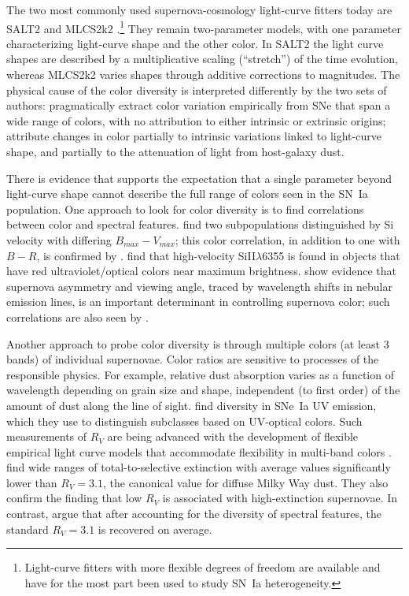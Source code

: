 \documentclass{aastex61}   	%
\begin{document}
The two most commonly used supernova-cosmology light-curve fitters today are SALT2 \citep{2007A&A...466...11G} and MLCS2k2
\citep{2007ApJ...659..122J}.\footnote{Light-curve fitters with more flexible degrees of freedom
\citep[e.g.][]{2008ApJ...681..482C, 2011AJ....141...19B, 2011ApJ...731..120M} are available and have for
the most part been used to study SN~Ia heterogeneity.}
They remain two-parameter models, with one parameter characterizing light-curve shape and the other
 color.
In SALT2 the light curve shapes are described by a multiplicative scaling (``stretch'')  of the time evolution,
 whereas MLCS2k2 varies shapes through additive corrections to magnitudes.
The physical cause of the color diversity is interpreted differently by the two sets of authors: 
\citet{2007A&A...466...11G} pragmatically extract color variation empirically from SNe that span a wide range of colors, with no attribution
to either intrinsic or extrinsic origins;
\citet{2007ApJ...659..122J}
attribute changes in color
partially to intrinsic variations linked to light-curve shape, and partially
to the attenuation of light from host-galaxy dust.


There is evidence that supports the expectation that a single parameter beyond light-curve shape  cannot describe the full range
of colors seen in the SN~Ia population.  One approach to look for color diversity is to find correlations between color and spectral features.
\citet{2009ApJ...699L.139W, 2011ApJ...729...55F} find two subpopulations distinguished
by Si velocity with differing $B_{max}-V_{max}$; this color correlation, in addition to one with $B-R$, is confirmed by
\citet{2014ApJ...797...75M}.
\citet{2015MNRAS.451.1973S}
find that high-velocity SiII$\lambda$6355 is found in objects that have red ultraviolet/optical colors near maximum brightness.
\citet{2011MNRAS.413.3075M} show evidence that supernova asymmetry and viewing angle,
traced by wavelength shifts in nebular emission lines, is an important determinant in controlling supernova color; such correlations are also seen by \citet{2011A&A...534L..15C}.

Another approach to probe color diversity is through multiple colors (at least 3 bands)
of individual supernovae.  Color ratios are sensitive to processes of the responsible physics.   For example,
relative dust absorption varies as a function of wavelength depending on grain size and shape,
independent (to first order) of the amount of dust along the line of sight.
\citet{2013ApJ...779...23M} find diversity in SNe~Ia UV emission, which they use to distinguish subclasses based on UV-optical colors.
Such measurements of $R_V$ are being advanced with the development of flexible empirical light curve models that accommodate flexibility in multi-band colors
\citep[e.g.][]{2011ApJ...731..120M}.
\citet{2014ApJ...789...32B, 2015MNRAS.453.3300A} find wide
ranges of total-to-selective extinction with average values significantly lower than $R_V = 3.1$,
the canonical value for diffuse Milky Way dust.
They also confirm the \citet{2011ApJ...731..120M, 2011ApJ...729...55F} finding that low $R_V$ is associated with high-extinction supernovae.
In contrast, \citet{2011A&A...529L...4C} argue that after accounting for the diversity of spectral features,
the standard $R_V=3.1$ is recovered on average.
\end{document}
